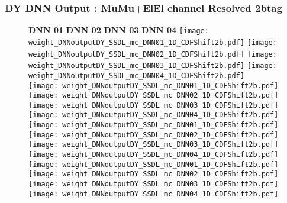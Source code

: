 \documentclass[9pt]{beamer}
\begin{document}
\begin{frame}
	\frametitle{DY DNN Output : MuMu+ElEl channel Resolved 2btag}
	\begin{figure}
	    \textbf{DNN 01} \hspace{1.2cm} \textbf{DNN 02} \hspace{1.2cm} \textbf{DNN 03} \hspace{1.2cm} \textbf{DNN 04}
        \centering
		\texttt{[image: weight\_DNNoutputDY\_SSDL\_mc\_DNN01\_1D\_CDFShift2b.pdf]}
		\texttt{[image: weight\_DNNoutputDY\_SSDL\_mc\_DNN02\_1D\_CDFShift2b.pdf]}
		\texttt{[image: weight\_DNNoutputDY\_SSDL\_mc\_DNN03\_1D\_CDFShift2b.pdf]}
		\texttt{[image: weight\_DNNoutputDY\_SSDL\_mc\_DNN04\_1D\_CDFShift2b.pdf]}\\
		\texttt{[image: weight\_DNNoutputDY\_SSDL\_mc\_DNN01\_1D\_CDFShift2b.pdf]}
		\texttt{[image: weight\_DNNoutputDY\_SSDL\_mc\_DNN02\_1D\_CDFShift2b.pdf]}
		\texttt{[image: weight\_DNNoutputDY\_SSDL\_mc\_DNN03\_1D\_CDFShift2b.pdf]}
		\texttt{[image: weight\_DNNoutputDY\_SSDL\_mc\_DNN04\_1D\_CDFShift2b.pdf]}\\
		\texttt{[image: weight\_DNNoutputDY\_SSDL\_mc\_DNN01\_1D\_CDFShift2b.pdf]}
		\texttt{[image: weight\_DNNoutputDY\_SSDL\_mc\_DNN02\_1D\_CDFShift2b.pdf]}
		\texttt{[image: weight\_DNNoutputDY\_SSDL\_mc\_DNN03\_1D\_CDFShift2b.pdf]}
		\texttt{[image: weight\_DNNoutputDY\_SSDL\_mc\_DNN04\_1D\_CDFShift2b.pdf]}\\
		\texttt{[image: weight\_DNNoutputDY\_SSDL\_mc\_DNN01\_1D\_CDFShift2b.pdf]}
		\texttt{[image: weight\_DNNoutputDY\_SSDL\_mc\_DNN02\_1D\_CDFShift2b.pdf]}
		\texttt{[image: weight\_DNNoutputDY\_SSDL\_mc\_DNN03\_1D\_CDFShift2b.pdf]}
		\texttt{[image: weight\_DNNoutputDY\_SSDL\_mc\_DNN04\_1D\_CDFShift2b.pdf]}\\
	\end{figure}
\end{frame}
\end{document}
